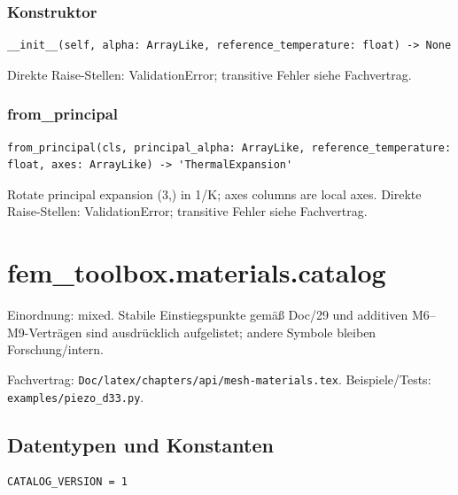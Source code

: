 \subsubsection*{Konstruktor}
\begin{lstlisting}
__init__(self, alpha: ArrayLike, reference_temperature: float) -> None
\end{lstlisting}
Direkte Raise-Stellen: ValidationError; transitive Fehler siehe Fachvertrag.
\subsubsection*{from\_principal}
\begin{lstlisting}
from_principal(cls, principal_alpha: ArrayLike, reference_temperature: float, axes: ArrayLike) -> 'ThermalExpansion'
\end{lstlisting}
Rotate principal expansion (3,) in 1/K; axes columns are local axes.
Direkte Raise-Stellen: ValidationError; transitive Fehler siehe Fachvertrag.
\section{fem\_toolbox.materials.catalog}
Einordnung: mixed. Stabile Einstiegspunkte gemäß Doc/29 und additiven M6–M9-Verträgen sind ausdrücklich aufgelistet; andere Symbole bleiben Forschung/intern.
\par Fachvertrag: \nolinkurl{Doc/latex/chapters/api/mesh-materials.tex}. Beispiele/Tests:
\nolinkurl{examples/piezo_d33.py}.
\subsection*{Datentypen und Konstanten}
\begin{lstlisting}
CATALOG_VERSION = 1
\end{lstlisting}
